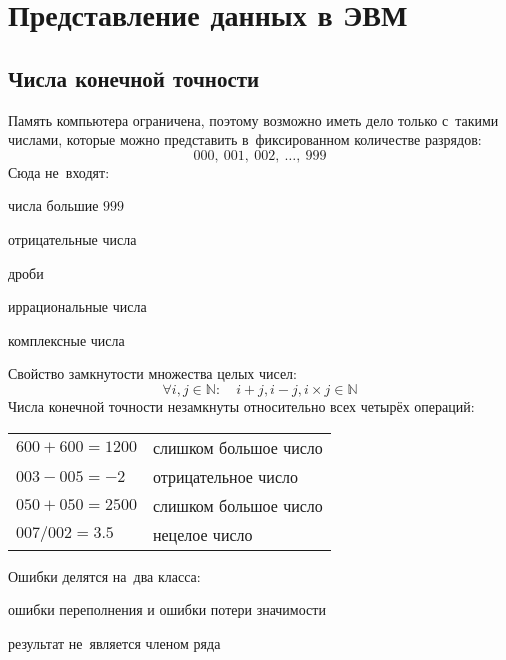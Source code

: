 
\chapter{Представление данных в ЭВМ}

\section{Числа конечной точности}
\vspace{-1\baselineskip}\begin{multicols}{2}\raggedcolumns\columnseprule=0.1pt
  Память компьютера ограничена, поэтому возможно иметь дело только с~такими числами, которые можно представить в~фиксированном количестве разрядов:
  \[
    000,~001,~002,~\ldots,~999
  \]
  Сюда не~входят:
  \begin{itemfeature}
    \item числа большие \(999\)
    \item отрицательные числа
    \item дроби
    \item иррациональные числа
    \item комплексные числа
  \end{itemfeature}
  Свойство замкнутости множества целых чисел:
  \[
    \forall i,j \in \mathbb N :\quad i+j, i-j, i\times j \in \mathbb N
  \]
  Числа конечной точности незамкнуты относительно всех четырёх операций:
  \begin{center}\begin{tabular}{l>{\small}l}
    \(600 + 600 = 1200\) & слишком большое число \\
    \(003 - 005 = -2\)   & отрицательное число \\
    \(050 + 050 = 2500\) & слишком большое число \\
    \(007 / 002 = 3.5\)  & нецелое число \\
  \end{tabular}\end{center}
  Ошибки делятся на~два класса:
  \begin{itemfeature}
    \item ошибки переполнения и ошибки потери значимости
    \item результат не~является членом ряда
  \end{itemfeature}
\end{multicols}

